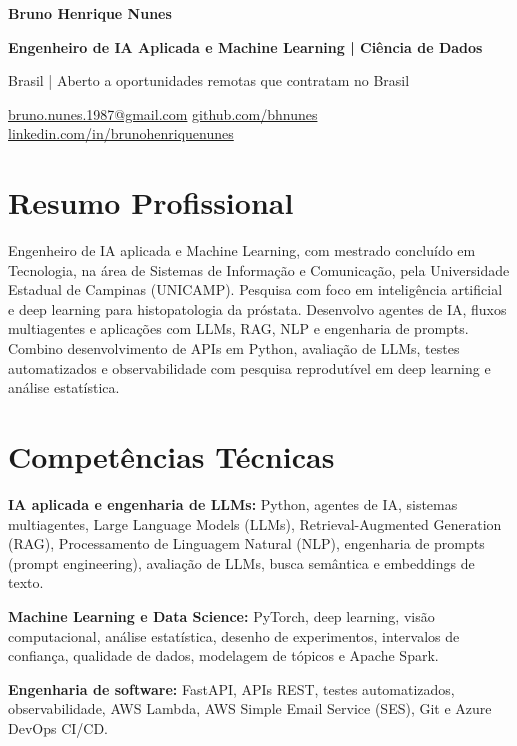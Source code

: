 \documentclass[10pt,a4paper]{article}
\begin{document}
\fontsize{10}{12.2}\selectfont

{\Large\bfseries Bruno Henrique Nunes}\par
{\large\bfseries Engenheiro de IA Aplicada e Machine Learning | Ciência de Dados}\par
Brasil | Aberto a oportunidades remotas que contratam no Brasil\par
\href{mailto:bruno.nunes.1987@gmail.com}{bruno.nunes.1987@gmail.com}
\quad\textbar\quad \href{https://github.com/bhnunes}{github.com/bhnunes}
\quad\textbar\quad \href{https://www.linkedin.com/in/brunohenriquenunes/}{linkedin.com/in/brunohenriquenunes}\par

\section{Resumo Profissional}
Engenheiro de IA aplicada e Machine Learning, com mestrado concluído em Tecnologia, na área de Sistemas de Informação e Comunicação, pela Universidade Estadual de Campinas (UNICAMP). Pesquisa com foco em inteligência artificial e deep learning para histopatologia da próstata. Desenvolvo agentes de IA, fluxos multiagentes e aplicações com LLMs, RAG, NLP e engenharia de prompts. Combino desenvolvimento de APIs em Python, avaliação de LLMs, testes automatizados e observabilidade com pesquisa reprodutível em deep learning e análise estatística.

\section{Competências Técnicas}
\textbf{IA aplicada e engenharia de LLMs:} Python, agentes de IA, sistemas multiagentes, Large Language Models (LLMs), Retrieval-Augmented Generation (RAG), Processamento de Linguagem Natural (NLP), engenharia de prompts (prompt engineering), avaliação de LLMs, busca semântica e embeddings de texto.\par
\textbf{Machine Learning e Data Science:} PyTorch, deep learning, visão computacional, análise estatística, desenho de experimentos, intervalos de confiança, qualidade de dados, modelagem de tópicos e Apache Spark.\par
\textbf{Engenharia de software:} FastAPI, APIs REST, testes automatizados, observabilidade, AWS Lambda, AWS Simple Email Service (SES), Git e Azure DevOps CI/CD.
\end{document}
